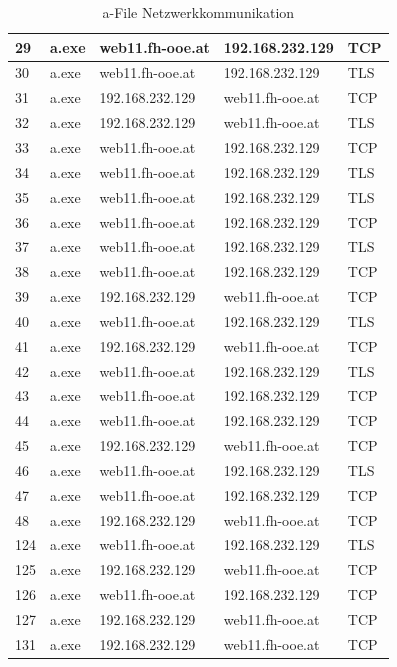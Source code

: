 \documentclass{article}
\begin{document}
\begin{table}[htbp]
\begin{tabular}{|m{1cm}|m{1.5cm}|m{3cm}|m{3cm}|m{1.4cm}|}
			29 &        a.exe & web11.fh-ooe.at & 192.168.232.129 &           TCP \\ \hline
			30 &        a.exe & web11.fh-ooe.at & 192.168.232.129 &           TLS \\ \hline
			31 &        a.exe & 192.168.232.129 & web11.fh-ooe.at &           TCP \\ \hline
			32 &        a.exe & 192.168.232.129 & web11.fh-ooe.at &           TLS \\ \hline
			33 &        a.exe & web11.fh-ooe.at & 192.168.232.129 &           TCP \\ \hline
			34 &        a.exe & web11.fh-ooe.at & 192.168.232.129 &           TLS \\ \hline
			35 &        a.exe & web11.fh-ooe.at & 192.168.232.129 &           TLS \\ \hline
			36 &        a.exe & web11.fh-ooe.at & 192.168.232.129 &           TCP \\ \hline
			37 &        a.exe & web11.fh-ooe.at & 192.168.232.129 &           TLS \\ \hline
			38 &        a.exe & web11.fh-ooe.at & 192.168.232.129 &           TCP \\ \hline
			39 &        a.exe & 192.168.232.129 & web11.fh-ooe.at &           TCP \\ \hline
			40 &        a.exe & web11.fh-ooe.at & 192.168.232.129 &           TLS \\ \hline
			41 &        a.exe & 192.168.232.129 & web11.fh-ooe.at &           TCP \\ \hline
			42 &        a.exe & web11.fh-ooe.at & 192.168.232.129 &           TLS \\ \hline
			43 &        a.exe & web11.fh-ooe.at & 192.168.232.129 &           TCP \\ \hline
			44 &        a.exe & web11.fh-ooe.at & 192.168.232.129 &           TCP \\ \hline
			45 &        a.exe & 192.168.232.129 & web11.fh-ooe.at &           TCP \\ \hline
			46 &        a.exe & web11.fh-ooe.at & 192.168.232.129 &           TLS \\ \hline
			47 &        a.exe & web11.fh-ooe.at & 192.168.232.129 &           TCP \\ \hline
			48 &        a.exe & 192.168.232.129 & web11.fh-ooe.at &           TCP \\ \hline
			124 &        a.exe & web11.fh-ooe.at & 192.168.232.129 &           TLS \\ \hline
			125 &        a.exe & 192.168.232.129 & web11.fh-ooe.at &           TCP \\ \hline
			126 &        a.exe & web11.fh-ooe.at & 192.168.232.129 &           TCP \\ \hline
			127 &        a.exe & 192.168.232.129 & web11.fh-ooe.at &           TCP \\ \hline
			131 &        a.exe & 192.168.232.129 & web11.fh-ooe.at &           TCP \\ \hline
		\end{tabular}
		\caption{a-File Netzwerkkommunikation}
		\label{table:a-network}
	\end{table}
	

	
	
	\label{LastPage}
	
\end{document}
